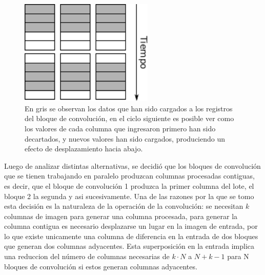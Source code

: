 \documentclass[conference,compsoc]{IEEEtran}
\begin{document}
\begin{figure}[!t]
\centering
\includegraphics[width=2.5in]{proc_conv.pdf}
\caption{En gris se observan los datos que han sido cargados a los registros del
bloque de convoluci\'on, en el ciclo siguiente es posible ver como los valores
de cada columna que ingresaron primero han sido decartados, y nuevos valores han
sido cargados, produciendo un efecto de desplazamiento hacia abajo.}
\label{proc_conv}
\end{figure}

Luego de analizar distintas alternativas, se decidi\'o que los bloques de
convoluci\'on que se tienen trabajando en paralelo produzcan columnas procesadas
contiguas, es decir, que el bloque de convoluci\'on 1 produzca la primer
columna del lote, el bloque 2 la segunda y asi sucesivamente. Una de las
razones por la que se tomo esta decisi\'on es la naturaleza de la operaci\'on de
la convoluci\'on: se necesitan $k$ columnas de imagen para generar una columna procesada, para generar la
columna contigua es necesario desplazarse un lugar en la imagen de entrada,
por lo que existe unicamente una columna de diferencia en la entrada de dos
bloques que generan dos columnas adyacentes. Esta superposici\'on en la entrada implica una
reduccion del n\'umero de columnas necesarias de $k \cdot N$ a $N+k-1$ para N
bloques de convoluci\'on si estos generan columnas adyacentes.


%
%
\end{document}
